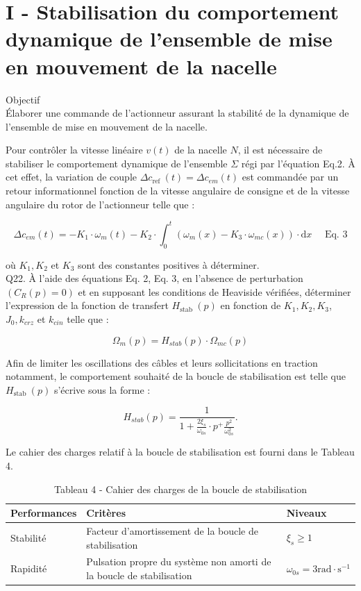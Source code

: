 \documentclass[10pt]{article}
\begin{document}
\section*{I - Stabilisation du comportement dynamique de l'ensemble de mise en mouvement de la nacelle}
Objectif\\
Élaborer une commande de l'actionneur assurant la stabilité de la dynamique de l'ensemble de mise en mouvement de la nacelle.

Pour contrôler la vitesse linéaire $v(t)$ de la nacelle $N$, il est nécessaire de stabiliser le comportement dynamique de l'ensemble $\Sigma$ régi par l'équation Eq.2. À cet effet, la variation de couple $\Delta c_{\text {ref }}(t)=\Delta c_{e m}(t)$ est commandée par un retour informationnel fonction de la vitesse angulaire de consigne et de la vitesse angulaire du rotor de l'actionneur telle que :

$$
\Delta c_{e m}(t)=-K_{1} \cdot \omega_{m}(t)-K_{2} \cdot \int_{0}^{t}\left(\omega_{m}(x)-K_{3} \cdot \omega_{m c}(x)\right) \cdot \mathrm{d} x \quad \text { Eq. } 3
$$

où $K_{1}, K_{2}$ et $K_{3}$ sont des constantes positives à déterminer.\\
Q22. À l'aide des équations Eq. 2, Eq. 3, en l'absence de perturbation $\left(C_{R}(p)=0\right)$ et en supposant les conditions de Heaviside vérifiées, déterminer l'expression de la fonction de transfert $H_{\text {stab }}(p)$ en fonction de $K_{1}, K_{2}, K_{3}$, $J_{0}, k_{c r z}$ et $k_{c i n}$ telle que :

$$
\Omega_{m}(p)=H_{s t a b}(p) \cdot \Omega_{m c}(p)
$$

Afin de limiter les oscillations des câbles et leurs sollicitations en traction notamment, le comportement souhaité de la boucle de stabilisation est telle que $H_{\text {stab }}(p)$ s'écrive sous la forme :

$$
H_{s t a b}(p)=\frac{1}{1+\frac{2 \xi_{s}}{\omega_{0 s}} \cdot p^{+} \frac{p^{2}}{\omega_{0 s}^{2}}} .
$$

Le cahier des charges relatif à la boucle de stabilisation est fourni dans le Tableau 4.

\begin{table}[h]
\begin{center}
\begin{tabular}[t]{|l|l|l|}
\hline
Performances & Critères & Niveaux \\
\hline
Stabilité & Facteur d'amortissement de la boucle de stabilisation & $\xi_{s} \geqslant 1$ \\
\hline
Rapidité & Pulsation propre du système non amorti de la boucle de stabilisation & $\omega_{0 s}=3 \mathrm{rad} \cdot \mathrm{s}^{-1}$ \\
\hline
\end{tabular}
\captionsetup{labelformat=empty}
\caption{Tableau 4 - Cahier des charges de la boucle de stabilisation}
\end{center}
\end{table}
\end{document}
